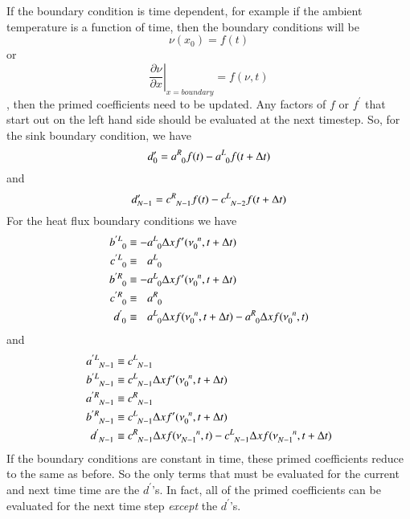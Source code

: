 \documentclass[letterpaper,12pt]{article}
\newcommand \bcf{f}
\begin{document}
If the boundary condition is time dependent, for example if the ambient temperature is a function of time, then
the boundary conditions will be
\begin{equation}
  \label{eq:td_sink_bc}
  \nu\left(x_0\right) = \bcf(t)
\end{equation}
or
\begin{equation}
  \label{eq:td_heat_flux_bc}
  \left. \frac{\partial \nu}{\partial x} \right|_{x = boundary} = \bcf(\nu,t)
\end{equation}
, then the primed coefficients need to be updated. Any factors of $\bcf$ or $\bcf^\prime$ that start out on the left
hand side should be evaluated at the next timestep. So, for the sink boundary condition, we have
\begin{equation}
  d'_0 = a\indices{^R_0} \bcf(t) - a\indices{^L_0} \bcf(t + \Delta t)
\end{equation}
and
\begin{equation}
  d'_{N-1} = c\indices{^R_{N-1}} \bcf(t) - c\indices{^L_{N-2}} \bcf(t+\Delta t)
\end{equation}
For the heat flux boundary conditions we have
\begin{align}
  b\indices{^{'L}_0} &\equiv          - a\indices{^L_0} \Delta x \bcf'(\nu\indices{_0^n},t+\Delta t) \\
  c\indices{^{'L}_0} &\equiv \phantom{-}a\indices{^L_0} \\
  b\indices{^{'R}_0} &\equiv          - a\indices{^L_0} \Delta x \bcf'(\nu\indices{_0^n},t+\Delta t) \\
  c\indices{^{'R}_0} &\equiv \phantom{-}a\indices{^R_0} \\
  d\indices{^{' }_0} &\equiv \phantom{-}a\indices{^L_0} \Delta x \bcf (\nu\indices{_0^n},t+\Delta t) - a\indices{^R_0} \Delta x \bcf (\nu\indices{_0^n},t)
\end{align}
and
\begin{align}
  a\indices{^{'L}_{N-1}} &\equiv    c\indices{^L_{N-1}} \\
  b\indices{^{'L}_{N-1}} &\equiv    c\indices{^L_{N-1}} \Delta x \bcf'(\nu\indices{_0^n},t+\Delta t) \\
  a\indices{^{'R}_{N-1}} &\equiv    c\indices{^R_{N-1}} \\
  b\indices{^{'R}_{N-1}} &\equiv    c\indices{^L_{N-1}} \Delta x \bcf'(\nu\indices{_0^n},t+\Delta t) \\
  d\indices{^{' }_{N-1}} &\equiv    c\indices{^R_{N-1}} \Delta x \bcf(\nu\indices{_{N-1}^n},t) - c\indices{^L_{N-1}} \Delta x \bcf (\nu\indices{_{N-1}^{n}},t+\Delta t)
\end{align}
If the boundary conditions are constant in time, these primed coefficients reduce to the same as before. So the only terms that must be evaluated
for the current and next time time are the $d^{\prime}$'s. In fact, all of the primed coefficients can be evaluated for the next time step \emph{except} the
$d^{\prime}$'s.
\end{document}

